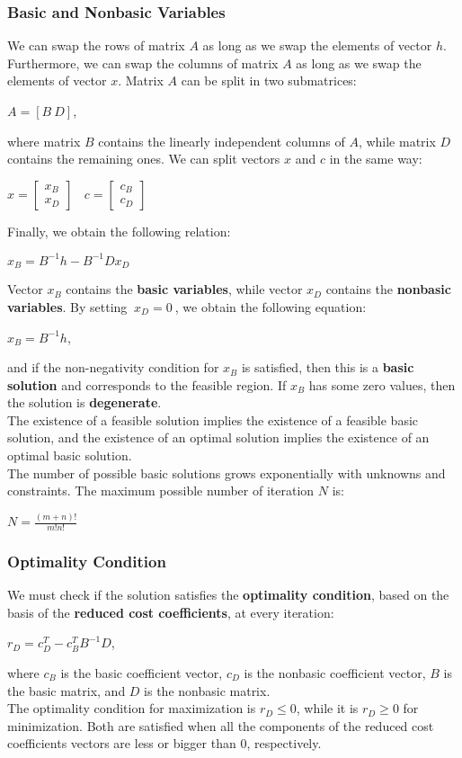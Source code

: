 \documentclass{article}
\begin{document}
\subsubsection{Basic and Nonbasic Variables}
We can swap the rows of matrix $A$ as long as we swap the elements of vector $h$. Furthermore, we can swap the columns of matrix $A$ as long as we swap the elements of vector $x$. Matrix $A$ can be split in two submatrices:
\begin{center}
    $A = [B \ D]$,
\end{center}
where matrix $B$ contains the linearly independent columns of $A$, while matrix $D$ contains the remaining ones. We can split vectors $x$ and $c$ in the same way:
\begin{center}
    $x =
    \begin{bmatrix}
    x_B \\
    x_D
    \end{bmatrix}
    ~~~~ c =
    \begin{bmatrix}
    c_B \\
    c_D
    \end{bmatrix}$
\end{center}
Finally, we obtain the following relation:
\begin{center}
    $x_B = B^{-1}h - B^{-1}Dx_D$
\end{center}
Vector $x_B$ contains the \textbf{basic variables}, while vector $x_D$ contains the \textbf{nonbasic variables}. By setting $ \ x_D = 0 \ $, we obtain the following equation:
\begin{center}
    $x_B = B^{-1}h$,
\end{center}
and if the non-negativity condition for $x_B$ is satisfied, then this is a \textbf{basic solution} and corresponds to the feasible region. If $x_B$ has some zero values, then the solution is \textbf{degenerate}. \\
The existence of a feasible solution implies the existence of a feasible basic solution, and the existence of an optimal solution implies the existence of an optimal basic solution. \\
The number of possible basic solutions grows exponentially with unknowns and constraints. The maximum possible number of iteration $N$ is:
\begin{center}
    $N = \displaystyle\frac{(m +n)!}{m! n!}$
\end{center}
\subsubsection{Optimality Condition}
We must check if the solution satisfies the \textbf{optimality condition}, based on the basis of the \textbf{reduced cost coefficients}, at every iteration:
\begin{center}
    $r_D = c_D^T - c_B^T B^{-1}D$,
\end{center}
where $c_B$ is the basic coefficient vector, $c_D$ is the nonbasic coefficient vector, $B$ is the basic matrix, and $D$ is the nonbasic matrix. \\
The optimality condition for maximization is $r_D \leq 0$, while it is $r_D \geq 0$ for minimization. Both are satisfied when all the components of the reduced cost coefficients vectors are less or bigger than $0$, respectively.
\end{document}
